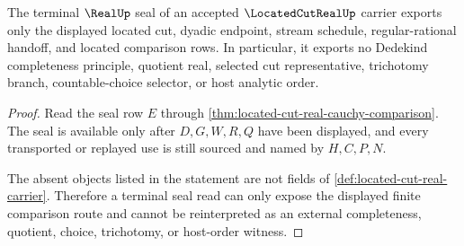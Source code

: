 \begin{theorem}
\label{thm:located-cut-real-nonescape}
The terminal $\RealUp$ seal of an accepted $\LocatedCutRealUp$ carrier exports only the displayed located cut, dyadic endpoint, stream schedule, regular-rational handoff, and located comparison rows. In particular, it exports no Dedekind completeness principle, quotient real, selected cut representative, trichotomy branch, countable-choice selector, or host analytic order.
\end{theorem}
\begin{proof}
Read the seal row $E$ through \autoref{thm:located-cut-real-cauchy-comparison}. The seal is available only after $D,G,W,R,Q$ have been displayed, and every transported or replayed use is still sourced and named by $H,C,P,N$.

The absent objects listed in the statement are not fields of \autoref{def:located-cut-real-carrier}. Therefore a terminal seal read can only expose the displayed finite comparison route and cannot be reinterpreted as an external completeness, quotient, choice, trichotomy, or host-order witness.
\end{proof}




